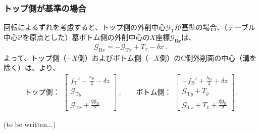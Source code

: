 \subsubsection{トップ側が基準の場合}
回転によるずれを考慮すると、トップ側の外削中心$\mathcal G_\mathrm T$が基準の場合、（テーブル中心Pを原点とした）墓ボトム側の外削中心の$X$座標$\mathcal G_{\mathrm Bx}$は、
\begin{align*}
  \mathcal G_{\mathrm Bx} = -\mathcal G_{\mathrm Tx}+T_x-\delta x\ .
\end{align*}
よって、トップ側（$+X$側）およびボトム側（$-X$側）のC側外削面の中心（溝を除く）は、より、
\begin{align*}
  \text{トップ側：}~~
  \left[
    \begin{array}{c}
      \displaystyle f_\mathrm T'-\frac{\kappa_p}2-\delta z\\[5pt]
      \mathcal G_{\mathrm Ty}\\[3pt]
      \displaystyle \mathcal G_{\mathrm Tx}+\frac{\mathfrak W_\mathrm B}2
    \end{array}
    \right]~, \qquad
  \text{ボトム側：}~~
  \left[
    \begin{array}{c}
      \displaystyle -f_\mathrm B'+\frac{h_\mathrm B}2+\delta z\\[5pt]
      \mathcal G_{\mathrm Ty}+T_y\\[3pt]
      \displaystyle \mathcal G_{\mathrm Tx}+T_x+\frac{\mathfrak W_\mathrm B}2
    \end{array}
  \right].
\end{align*}



\clearpage
(to be written...)
